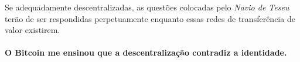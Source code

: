 Se adequadamente descentralizadas, as questões colocadas pelo \textit{Navio de Teseu}
terão de ser respondidas perpetuamente enquanto essas redes de
transferência de valor existirem.

\paragraph{O Bitcoin me ensinou que a descentralização contradiz a identidade.}

%
%
%
%
